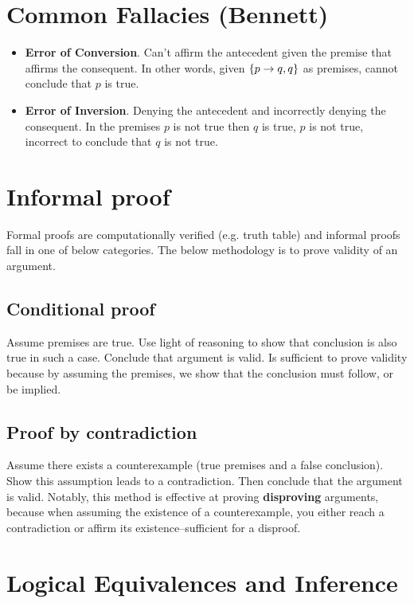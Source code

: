 \section{Common Fallacies (Bennett)}

\begin{itemize} 
    \item \textbf{Error of Conversion}. Can't affirm the antecedent given the premise that affirms the consequent. In other words, given $\{p\rightarrow q,q\}$ as premises, cannot conclude that $p$ is true.
    \item \textbf{Error of Inversion}. Denying the antecedent and incorrectly denying the consequent. In the premises $p$ is not true then $q$ is true, $p$ is not true, incorrect to conclude that $q$ is not true.
\end{itemize}

\section{Informal proof}

Formal proofs are computationally verified (e.g. truth table) and informal proofs fall in one of below categories.
The below methodology is to prove validity of an argument.

\subsection{Conditional proof}

Assume premises are true. Use light of reasoning to show that conclusion is also true in such a case. Conclude that argument is valid. Is sufficient to prove validity because by assuming the premises, we show that the conclusion must follow, or be implied.

\subsection{Proof by contradiction}

Assume there exists a counterexample (true premises and a false conclusion). Show this assumption leads to a contradiction. Then conclude that the argument is valid.
Notably, this method is effective at proving \textbf{disproving} arguments, because when assuming the existence of a counterexample, you either reach a contradiction or affirm its existence–sufficient for a disproof.

\section{Logical Equivalences and Inference}

